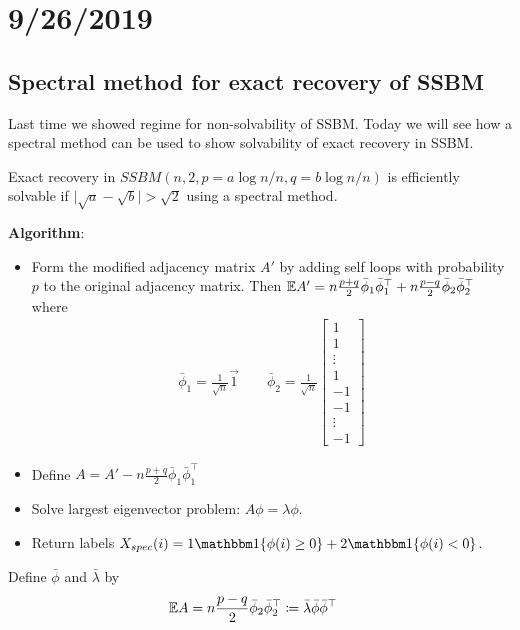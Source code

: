 \section{9/26/2019}

\subsection{Spectral method for exact recovery of SSBM}

Last time we showed regime for non-solvability of SSBM.
Today we will see how a spectral method can be used to show
solvability of exact recovery in SSBM.

\begin{theorem}
  Exact recovery in $SSBM(n, 2, p = a\log n / n, q = b \log n / n)$
  is efficiently solvable if $\lvert \sqrt{a} - \sqrt{b} \rvert > \sqrt{2}$
  using a spectral method.
\end{theorem}

\textbf{Algorithm}:
\begin{itemize}
  \item Form the modified adjacency matrix $A'$ by adding
    self loops with probability $p$ to the original adjacency matrix.
    Then $\mathbb{E} A'
    = n \frac{p+q}{2} \bar\phi_1 \bar\phi_1^\top
    + n \frac{p-q}{2} \bar\phi_2 \bar\phi_2^\top
    $ where \begin{align}
      \bar\phi_1 = \frac{1}{\sqrt{n}} \vec{1} \qquad
      \bar\phi_2 = \frac{1}{\sqrt{n}} \begin{bmatrix}
        1 \\ 1 \\ \vdots \\ 1 \\ -1 \\ -1 \\ \vdots \\ -1
      \end{bmatrix}
    \end{align}
  \item Define $A = A' - n \frac{p+q}{2} \bar\phi_1 \bar\phi_1^\top$
  \item Solve largest eigenvector problem: $A \phi = \lambda \phi$.
  \item Return labels $X_{spec}(i) = 1 \ind\{\phi(i) \geq 0\} + 2 \ind\{\phi(i) < 0\}
    $.
\end{itemize}

Define $\bar\phi$ and $\bar\lambda$ by
\begin{align}
  \mathbb{E} A &= n \frac{p-q}{2} \bar\phi_2 \bar\phi_2^\top
  \coloneqq \bar\lambda \bar\phi \bar\phi^\top
\end{align}

